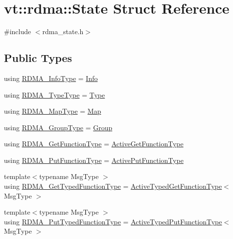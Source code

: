 \hypertarget{structvt_1_1rdma_1_1_state}{}\section{vt\+:\+:rdma\+:\+:State Struct Reference}
\label{structvt_1_1rdma_1_1_state}


{\ttfamily \#include $<$rdma\+\_\+state.\+h$>$}

\subsection*{Public Types}
\begin{DoxyCompactItemize}
\item 
using \hyperlink{structvt_1_1rdma_1_1_state_a6a78216795efe7fb6966c33b1a21d7cf}{R\+D\+M\+A\+\_\+\+Info\+Type} = \hyperlink{structvt_1_1rdma_1_1_info}{Info}
\item 
using \hyperlink{structvt_1_1rdma_1_1_state_a69c1d74d76a8e46f428b657eb1c763c1}{R\+D\+M\+A\+\_\+\+Type\+Type} = \hyperlink{namespacevt_1_1rdma_ac848e1d9da43db6294bd06f83e5d3946}{Type}
\item 
using \hyperlink{structvt_1_1rdma_1_1_state_a5443b0cb40188657e470a8be0bfa9ad7}{R\+D\+M\+A\+\_\+\+Map\+Type} = \hyperlink{structvt_1_1rdma_1_1_map}{Map}
\item 
using \hyperlink{structvt_1_1rdma_1_1_state_aec26643b760f80a59e0c07c580e99ebc}{R\+D\+M\+A\+\_\+\+Group\+Type} = \hyperlink{structvt_1_1rdma_1_1_group}{Group}
\item 
using \hyperlink{structvt_1_1rdma_1_1_state_af0baaa6ac5c3b7b256d032f2ee845676}{R\+D\+M\+A\+\_\+\+Get\+Function\+Type} = \hyperlink{namespacevt_1_1rdma_af564945ba7e35e15bccfb9c2a8d7ebd7}{Active\+Get\+Function\+Type}
\item 
using \hyperlink{structvt_1_1rdma_1_1_state_aa43a5d043fe01086818e9c5c364341d4}{R\+D\+M\+A\+\_\+\+Put\+Function\+Type} = \hyperlink{namespacevt_1_1rdma_a9adc598d6d34e2ed3c143711992674d8}{Active\+Put\+Function\+Type}
\item 
{\footnotesize template$<$typename Msg\+Type $>$ }\\using \hyperlink{structvt_1_1rdma_1_1_state_a95b006a568982435e63aa18feb5fc202}{R\+D\+M\+A\+\_\+\+Get\+Typed\+Function\+Type} = \hyperlink{namespacevt_1_1rdma_a903d8f605dadc2456d4a1c6fcb83eda4}{Active\+Typed\+Get\+Function\+Type}$<$ Msg\+Type $>$
\item 
{\footnotesize template$<$typename Msg\+Type $>$ }\\using \hyperlink{structvt_1_1rdma_1_1_state_a3f76d1ccdab20ed3091e36d8fb9ecda5}{R\+D\+M\+A\+\_\+\+Put\+Typed\+Function\+Type} = \hyperlink{namespacevt_1_1rdma_a56f7eb7ecfa7e6824d3abb4afb634a37}{Active\+Typed\+Put\+Function\+Type}$<$ Msg\+Type $>$

\end{DoxyCompactItemize}
